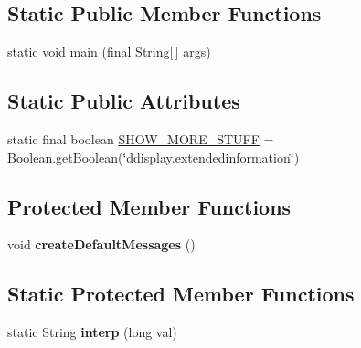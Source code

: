 \subsection*{Static Public Member Functions}
\begin{DoxyCompactItemize}
\item 
static void \hyperlink{classgov_1_1fnal_1_1ppd_1_1dd_1_1emergency_1_1EmergencyLaunchGUI_a182c4fee71b9dd4d099e75f2c1a44646}{main} (final String\mbox{[}$\,$\mbox{]} args)
\end{DoxyCompactItemize}
\subsection*{Static Public Attributes}
\begin{DoxyCompactItemize}
\item 
static final boolean \hyperlink{classgov_1_1fnal_1_1ppd_1_1dd_1_1emergency_1_1EmergencyLaunchGUI_a38b676d30b6ac1c12dbc4b790f93b729}{S\-H\-O\-W\-\_\-\-M\-O\-R\-E\-\_\-\-S\-T\-U\-F\-F} = Boolean.\-get\-Boolean(\char`\"{}ddisplay.\-extendedinformation\char`\"{})
\end{DoxyCompactItemize}
\subsection*{Protected Member Functions}
\begin{DoxyCompactItemize}
\item 
\hypertarget{classgov_1_1fnal_1_1ppd_1_1dd_1_1emergency_1_1EmergencyLaunchGUI_ac3a291908743dcb58758bfc8d56ce127}{void {\bfseries create\-Default\-Messages} ()}\label{classgov_1_1fnal_1_1ppd_1_1dd_1_1emergency_1_1EmergencyLaunchGUI_ac3a291908743dcb58758bfc8d56ce127}

\end{DoxyCompactItemize}
\subsection*{Static Protected Member Functions}
\begin{DoxyCompactItemize}
\item 
\hypertarget{classgov_1_1fnal_1_1ppd_1_1dd_1_1emergency_1_1EmergencyLaunchGUI_a7d9de8a18d1e65facf89c233cfcafc83}{static String {\bfseries interp} (long val)}\label{classgov_1_1fnal_1_1ppd_1_1dd_1_1emergency_1_1EmergencyLaunchGUI_a7d9de8a18d1e65facf89c233cfcafc83}

\end{DoxyCompactItemize}


